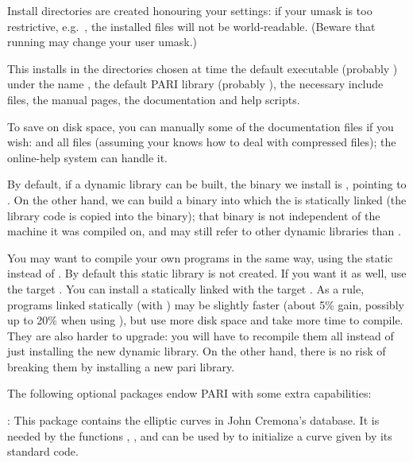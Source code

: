  Install directories are created honouring your 
settings: if your umask is too restrictive, e.g.~, the installed
files will not be world-readable. (Beware that running  may change
your user umask.)

This installs in the directories chosen at  time the default
 executable (probably ) under the name , the
default PARI library (probably ), the necessary include
files, the manual pages, the documentation and help scripts.

To save on disk space, you can manually  some of the documentation
files if you wish:  and all  files (assuming your
 knows how to deal with compressed files); the online-help system
can handle it.

By default, if a dynamic library  can be built, the 
binary we install is , pointing to . On the other
hand, we can build a  binary into which the  is
statically linked (the library code is copied into the binary); that binary
is not independent of the machine it was compiled on, and may still refer to
other dynamic libraries than .

You may want to compile your own programs in the same way, using the static
 instead of . By default this static library
 is not created. If you want it as well, use the target
. You can install a statically linked  with
the target . As a rule, programs linked statically
(with ) may be slightly faster (about 5\% gain, possibly
up to 20\% when using ), but use more disk space and take more
time to compile. They are also harder to upgrade: you will have to recompile
them all instead of just installing the new dynamic library. On the other
hand, there is no risk of breaking them by installing a new pari library.

 The following optional packages endow PARI with some
extra capabilities:

\item {}: This package contains the elliptic curves in
John Cremona's database. It is needed by the functions ,
,  and can be used by  to initialize a curve given by its standard code.

